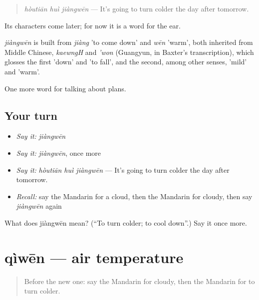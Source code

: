\begin{quote}
\emph{hòutiān huì jiàngwēn} — It's going to turn colder the day after tomorrow.
\end{quote}

Its characters come later; for now it is a word for the ear.

\begin{cousinweb}
\emph{jiàngwēn} is built from \emph{jiàng} 'to come down' and \emph{wēn} 'warm', both inherited from Middle Chinese, \emph{kaewngH} and \emph{'won} (Guangyun, in Baxter's transcription), which glosses the first 'down' and 'to fall', and the second, among other senses, 'mild' and 'warm'.
\end{cousinweb}

\begin{grammarlens}[title={What you've built}]
One more word for talking about plans.
\end{grammarlens}

\subsection*{Your turn}
\begin{itemize}
\raggedright
  \item \emph{Say it:} \emph{jiàngwēn}
  \item \emph{Say it:} \emph{jiàngwēn}, once more
  \item \emph{Say it:} \emph{hòutiān huì jiàngwēn} — It's going to turn colder the day after tomorrow.
  \item \emph{Recall:} say the Mandarin for a cloud, then the Mandarin for cloudy, then say \emph{jiàngwēn} again
\end{itemize}

\begin{tcolorbox}[breakable,colback=teal!4,colframe=teal!35!black,title={Before you move on}]
What does jiàngwēn mean? (\textquotedblleft{}To turn colder; to cool down\textquotedblright{}.) Say it once more.
\end{tcolorbox}
\section[qìwēn]{qìwēn — air temperature}

\label{lesson:ZH-C219-qiwen}



\begin{quote}
Before the new one: say the Mandarin for cloudy, then the Mandarin for to turn colder.
\end{quote}

